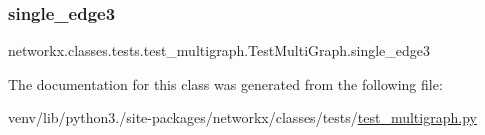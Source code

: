 \subsubsection{\texorpdfstring{single\+\_\+edge3}{single\_edge3}}
{\footnotesize\ttfamily networkx.\+classes.\+tests.\+test\+\_\+multigraph.\+Test\+Multi\+Graph.\+single\+\_\+edge3\hspace{0.3cm}{\ttfamily [static]}}



The documentation for this class was generated from the following file\+:\begin{DoxyCompactItemize}
\item 
venv/lib/python3./site-\/packages/networkx/classes/tests/\hyperlink{test__multigraph_8py}{test\+\_\+multigraph.\+py}\end{DoxyCompactItemize}
